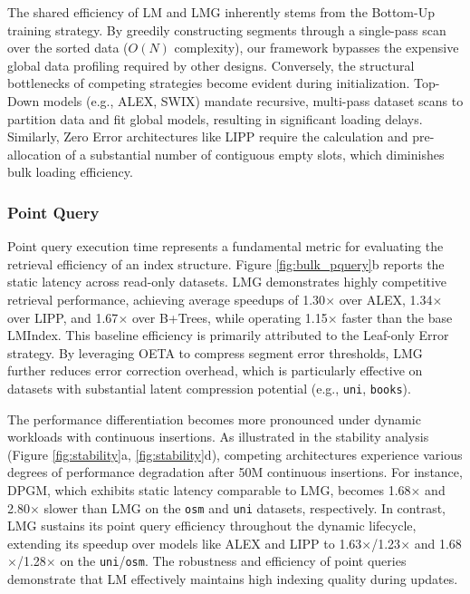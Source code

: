 The shared efficiency of LM and LMG inherently stems from the Bottom-Up training strategy. By greedily constructing segments through a single-pass scan over the sorted data ($O(N)$ complexity), our framework bypasses the expensive global data profiling required by other designs. Conversely, the structural bottlenecks of competing strategies become evident during initialization. Top-Down models (e.g., ALEX, SWIX) mandate recursive, multi-pass dataset scans to partition data and fit global models, resulting in significant loading delays. Similarly, Zero Error architectures like LIPP require the calculation and pre-allocation of a substantial number of contiguous empty slots, which diminishes bulk loading efficiency.

\subsubsection{Point Query}
\label{sec:point_query}
Point query execution time represents a fundamental metric for evaluating the retrieval efficiency of an index structure. Figure \ref{fig:bulk_pquery}b reports the static latency across read-only datasets. LMG demonstrates highly competitive retrieval performance, achieving average speedups of 1.30$\times$ over ALEX, 1.34$\times$ over LIPP, and 1.67$\times$ over B+Trees, while operating 1.15$\times$ faster than the base LMIndex. This baseline efficiency is primarily attributed to the Leaf-only Error strategy. By leveraging OETA to compress segment error thresholds, LMG further reduces error correction overhead, which is particularly effective on datasets with substantial latent compression potential (e.g., \texttt{uni}, \texttt{books}).

The performance differentiation becomes more pronounced under dynamic workloads with continuous insertions. As illustrated in the stability analysis (Figure \ref{fig:stability}a, \ref{fig:stability}d), competing architectures experience various degrees of performance degradation after 50M continuous insertions. For instance, DPGM, which exhibits static latency comparable to LMG, becomes 1.68$\times$ and 2.80$\times$ slower than LMG on the \texttt{osm} and \texttt{uni} datasets, respectively. In contrast, LMG sustains its point query efficiency throughout the dynamic lifecycle, extending its speedup over models like ALEX and LIPP to 1.63$\times$/1.23$\times$ and 1.68$\times$/1.28$\times$ on the \texttt{uni}/\texttt{osm}. The robustness and efficiency of point queries demonstrate that LM effectively maintains high indexing quality during updates.

